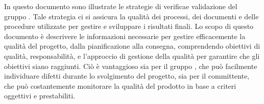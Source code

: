 
In questo documento sono illustrate le {strategie} di {verifica}e 
{validazione} del gruppo \gruppo. 
Tale strategia ci si assicura la qualità dei processi, dei documenti e delle procedure 
utilizzate per gestire e sviluppare i risultati finali.
Lo scopo di questo documento è descrivere le informazioni necessarie per gestire efficacemente 
la qualità del progetto, dalla pianificazione alla consegna, comprendendo obiettivi 
di qualità, responsabilità, e l'approccio di gestione della qualità per 
garantire che gli obiettivi siano raggiunti.\newline
Ciò è vantaggioso sia per il gruppo \gruppo , che può facilmente individuare difetti 
durante lo svolgimento del progetto, sia per il {committente}, che può costantemente 
monitorare la qualità del prodotto in base a criteri oggettivi e prestabiliti.

